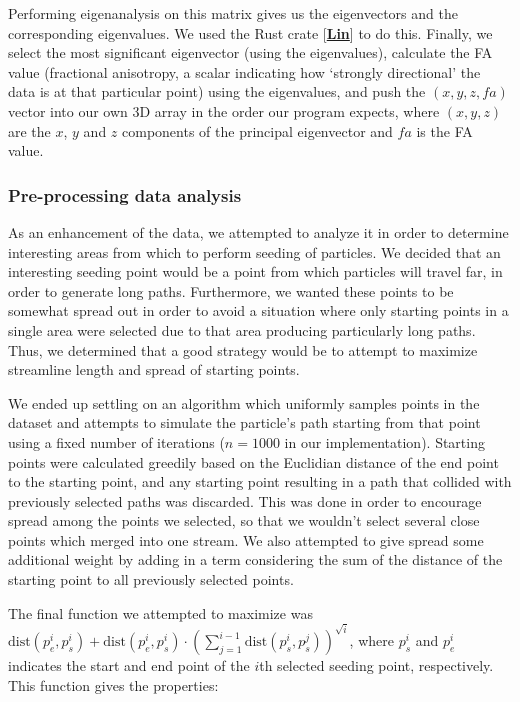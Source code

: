 \documentclass{article}
\newcommand{\code}[1]{\fcolorbox{codebd}{codebg}{\lstinline[basicstyle=\ttfamily\color{codefg}]{#1}}}
\newcommand{\reference}[1]{[\hyperref[ref:#1]{\textbf{#1}}]}
\begin{document}
Performing eigenanalysis on this matrix gives us the eigenvectors and the corresponding eigenvalues. We used the Rust crate \code{nalgebra} \reference{Lin} to do this. Finally, we select the most significant eigenvector (using the eigenvalues), calculate the FA value (fractional anisotropy, a scalar indicating how `strongly directional' the data is at that particular point) using the eigenvalues, and push the \((x, y, z, fa)\) vector into our own 3D array in the order our program expects, where \((x, y, z)\) are the \(x\), \(y\) and \(z\) components of the principal eigenvector and \(fa\) is the FA value.

\subsubsection*{Pre-processing data analysis}\label{sec:prepro}

As an enhancement of the data, we attempted to analyze it in order to determine interesting areas from which to perform seeding of particles. We decided that an interesting seeding point would be a point from which particles will travel far, in order to generate long paths. Furthermore, we wanted these points to be somewhat spread out in order to avoid a situation where only starting points in a single area were selected due to that area producing particularly long paths. Thus, we determined that a good strategy would be to attempt to maximize streamline length and spread of starting points.

We ended up settling on an algorithm which uniformly samples points in the dataset and attempts to simulate the particle's path starting from that point using a fixed number of iterations (\(n = 1000\) in our implementation). Starting points were calculated greedily based on the Euclidian distance of the end point to the starting point, and any starting point resulting in a path that collided with previously selected paths was discarded. This was done in order to encourage spread among the points we selected, so that we wouldn't select several close points which merged into one stream. We also attempted to give spread some additional weight by adding in a term considering the sum of the distance of the starting point to all previously selected points.

The final function we attempted to maximize was \(\textrm{dist}(p_e^i, p_s^i) + \textrm{dist}(p_e^i, p_s^i)\cdot{(\sum_{j=1}^{i-1}{\textrm{dist}(p_s^i, p_s^j)})}^{\sqrt{i}}\), where \(p_s^i\) and \(p_e^i\) indicates the start and end point of the \(i\)th selected seeding point, respectively. This function gives the properties:
\end{document}
